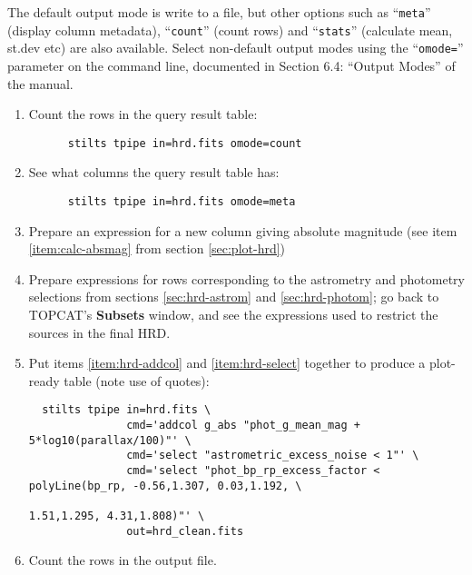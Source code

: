 \documentclass{article}
\newcommand{\lab}[1]{{\bf #1}}
\begin{document}
The default output mode is write to a file,
but other options such as ``{\tt meta}'' (display column metadata),
``{\tt count}'' (count rows) and ``{\tt stats}'' (calculate mean, st.dev etc)
are also available.
Select non-default output modes using the ``{\tt omode=}'' parameter
on the command line, documented in Section 6.4: ``Output Modes'' of the manual.

\begin{enumerate}
\item Count the rows in the query result table:
      \begin{verbatim}
      stilts tpipe in=hrd.fits omode=count
      \end{verbatim}
      \vspace*{-3ex}
\item See what columns the query result table has:
      \begin{verbatim}
      stilts tpipe in=hrd.fits omode=meta
      \end{verbatim}
      \vspace*{-3ex}
\item Prepare an expression for a new column giving absolute magnitude
      (see item \ref{item:calc-absmag} from section \ref{sec:plot-hrd})
      \label{item:hrd-addcol}
\item Prepare expressions for rows corresponding to the
      astrometry and photometry selections
      from sections \ref{sec:hrd-astrom} and \ref{sec:hrd-photom};
      go back to TOPCAT's \lab{Subsets} window, and see the expressions
      used to restrict the sources in the final HRD.
      \label{item:hrd-select}
\item Put items \ref{item:hrd-addcol} and \ref{item:hrd-select} together
      to produce a plot-ready table (note use of quotes):
      \begin{verbatim}
  stilts tpipe in=hrd.fits \
               cmd='addcol g_abs "phot_g_mean_mag + 5*log10(parallax/100)"' \
               cmd='select "astrometric_excess_noise < 1"' \
               cmd='select "phot_bp_rp_excess_factor < polyLine(bp_rp, -0.56,1.307, 0.03,1.192, \
                                                                       1.51,1.295, 4.31,1.808)"' \
               out=hrd_clean.fits
      \end{verbatim}
      \vspace*{-3ex}
\item Count the rows in the output file.
\end{enumerate}
\end{document}
